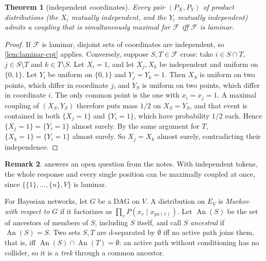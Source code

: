 \documentclass[11pt]{article}
\newtheorem{theorem}{Theorem}[section]
\theoremstyle{definition}
\newtheorem{remark}[theorem]{Remark}
\newcommand{\An}{\operatorname{An}}
\newcommand{\Var}{V}
\newcommand{\F}{\mathcal{F}}
\begin{document}
\begin{theorem}[independent coordinates]\label{thm:char-indep}
Every pair $(P_X,P_Y)$ of product distributions (the $X_i$ mutually independent,
and the $Y_i$ mutually independent) admits a coupling that is simultaneously
maximal for $\F$ iff $\F$ is laminar.
\end{theorem}
\begin{proof}
If $\F$ is laminar, disjoint sets of coordinates are independent, so
\cref{lem:laminar-cpt} applies. Conversely, suppose $S,T\in\F$ cross: take
$i\in S\cap T$, $j\in S\setminus T$ and $k\in T\setminus S$. Let $X_i=1$, and
let $X_j,X_k$ be independent and uniform on $\{0,1\}$. Let $Y_i$ be uniform on
$\{0,1\}$ and $Y_j=Y_k=1$. Then $X_S$ is uniform on two points, which differ in
coordinate $j$, and $Y_S$ is uniform on two points, which differ in coordinate
$i$. The only common point is the one with $x_i=x_j=1$. A maximal coupling of
$(X_S,Y_S)$ therefore puts mass $1/2$ on $X_S=Y_S$, and that event is contained
in both $\{X_j=1\}$ and $\{Y_i=1\}$, which have probability $1/2$ each. Hence
$\{X_j=1\}=\{Y_i=1\}$ almost surely. By the same argument for $T$,
$\{X_k=1\}=\{Y_i=1\}$ almost surely. So $X_j=X_k$ almost surely, contradicting
their independence.
\end{proof}

\begin{remark}
 answers an open question from the notes. With independent
tokens, the whole response and every single position can be maximally coupled
at once, since $\{\{1\},\dots,\{n\},\Var\}$ is laminar.
\end{remark}

For Bayesian networks, let $G$ be a DAG on $\Var$. A distribution on $E_\Var$ is
\emph{Markov with respect to $G$} if it factorizes as
$\prod_vP(x_v\mid x_{\mathrm{pa}(v)})$. Let $\An(S)$ be the set of ancestors of
members of $S$, including $S$ itself, and call $S$ \emph{ancestral} if
$\An(S)=S$. Two sets $S,T$ are d-separated by $\emptyset$ iff no active path
joins them, that is, iff $\An(S)\cap\An(T)=\emptyset$: an active path without
conditioning has no collider, so it is a \emph{trek} through a common ancestor.
\end{document}
